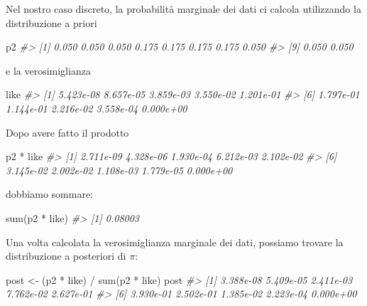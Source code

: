 \documentclass[
  11pt,
]{krantz}
\makeatletter
\newenvironment{Shaded}{\begin{snugshade}}{\end{snugshade}}
\newcommand{\CommentTok}[1]{\textcolor[rgb]{0.37,0.37,0.37}{\textit{#1}}}
\newcommand{\FunctionTok}[1]{\textcolor[rgb]{0,0,0}{#1}}
\newcommand{\NormalTok}[1]{#1}
\newcommand{\OtherTok}[1]{\textcolor[rgb]{0.37,0.37,0.37}{#1}}
\newcommand{\SpecialCharTok}[1]{\textcolor[rgb]{0,0,0}{#1}}
\newenvironment{kframe}{%
\medskip{}
\setlength{\fboxsep}{.8em}
 \def\at@end@of@kframe{}%
 \ifinner\ifhmode%
  \def\at@end@of@kframe{\end{minipage}}%
  \begin{minipage}{\columnwidth}%
 \fi\fi%
 \def\FrameCommand##1{\hskip\@totalleftmargin \hskip-\fboxsep
 \colorbox{shadecolor}{##1}\hskip-\fboxsep
     \hskip-\linewidth \hskip-\@totalleftmargin \hskip\columnwidth}%
 \MakeFramed {\advance\hsize-\width
   \@totalleftmargin\z@ \linewidth\hsize
   \@setminipage}}%
 {\par\unskip\endMakeFramed%
 \at@end@of@kframe}
\renewenvironment{Shaded}{\begin{kframe}}{\end{kframe}}
\theoremstyle{definition}
\theoremstyle{definition}
\theoremstyle{definition}
\theoremstyle{definition}
\theoremstyle{remark}
\makeatother
\begin{document}
Nel nostro caso discreto, la probabilità marginale dei dati ci calcola utilizzando la distribuzione a priori

\begin{Shaded}
\begin{Highlighting}[]
\NormalTok{p2}
\CommentTok{\#\textgreater{}  [1] 0.050 0.050 0.050 0.175 0.175 0.175 0.175 0.050}
\CommentTok{\#\textgreater{}  [9] 0.050 0.050}
\end{Highlighting}
\end{Shaded}

e la verosimiglianza

\begin{Shaded}
\begin{Highlighting}[]
\NormalTok{like}
\CommentTok{\#\textgreater{}  [1] 5.423e{-}08 8.657e{-}05 3.859e{-}03 3.550e{-}02 1.201e{-}01}
\CommentTok{\#\textgreater{}  [6] 1.797e{-}01 1.144e{-}01 2.216e{-}02 3.558e{-}04 0.000e+00}
\end{Highlighting}
\end{Shaded}

Dopo avere fatto il prodotto

\begin{Shaded}
\begin{Highlighting}[]
\NormalTok{p2 }\SpecialCharTok{*}\NormalTok{ like}
\CommentTok{\#\textgreater{}  [1] 2.711e{-}09 4.328e{-}06 1.930e{-}04 6.212e{-}03 2.102e{-}02}
\CommentTok{\#\textgreater{}  [6] 3.145e{-}02 2.002e{-}02 1.108e{-}03 1.779e{-}05 0.000e+00}
\end{Highlighting}
\end{Shaded}

dobbiamo sommare:

\begin{Shaded}
\begin{Highlighting}[]
\FunctionTok{sum}\NormalTok{(p2 }\SpecialCharTok{*}\NormalTok{ like)}
\CommentTok{\#\textgreater{} [1] 0.08003}
\end{Highlighting}
\end{Shaded}

Una volta calcolata la verosimiglianza marginale dei dati, possiamo trovare la distribuzione a posteriori di \(\pi\):

\begin{Shaded}
\begin{Highlighting}[]
\NormalTok{post }\OtherTok{\textless{}{-}}\NormalTok{ (p2 }\SpecialCharTok{*}\NormalTok{ like) }\SpecialCharTok{/} \FunctionTok{sum}\NormalTok{(p2 }\SpecialCharTok{*}\NormalTok{ like)}
\NormalTok{post}
\CommentTok{\#\textgreater{}  [1] 3.388e{-}08 5.409e{-}05 2.411e{-}03 7.762e{-}02 2.627e{-}01}
\CommentTok{\#\textgreater{}  [6] 3.930e{-}01 2.502e{-}01 1.385e{-}02 2.223e{-}04 0.000e+00}
\end{Highlighting}
\end{Shaded}
\end{document}

